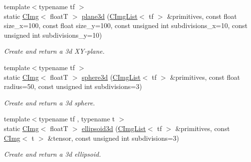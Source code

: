 \begin{DoxyCompactItemize}
{\footnotesize template$<$typename tf $>$ }\\static \hyperlink{structcimg__library_1_1CImg}{CImg}$<$ floatT $>$ \hyperlink{structcimg__library_1_1CImg_a84e453e73d27d8b27abd7a87d207c6a2}{plane3d} (\hyperlink{structcimg__library_1_1CImgList}{CImgList}$<$ tf $>$ \&primitives, const float size\_\-x=100, const float size\_\-y=100, const unsigned int subdivisions\_\-x=10, const unsigned int subdivisions\_\-y=10)
\begin{DoxyCompactList}\small\item\em Create and return a 3d XY-\/plane. \item\end{DoxyCompactList}\item 
{\footnotesize template$<$typename tf $>$ }\\static \hyperlink{structcimg__library_1_1CImg}{CImg}$<$ floatT $>$ \hyperlink{structcimg__library_1_1CImg_a612264fd3b4223e6ecf99b05a6e220cd}{sphere3d} (\hyperlink{structcimg__library_1_1CImgList}{CImgList}$<$ tf $>$ \&primitives, const float radius=50, const unsigned int subdivisions=3)
\begin{DoxyCompactList}\small\item\em Create and return a 3d sphere. \item\end{DoxyCompactList}\item 
{\footnotesize template$<$typename tf , typename t $>$ }\\static \hyperlink{structcimg__library_1_1CImg}{CImg}$<$ floatT $>$ \hyperlink{structcimg__library_1_1CImg_ae24de98deb46f84769fd72c504ceedc2}{ellipsoid3d} (\hyperlink{structcimg__library_1_1CImgList}{CImgList}$<$ tf $>$ \&primitives, const \hyperlink{structcimg__library_1_1CImg}{CImg}$<$ t $>$ \&tensor, const unsigned int subdivisions=3)
\begin{DoxyCompactList}\small\item\em Create and return a 3d ellipsoid. \item\end{DoxyCompactList}\end{DoxyCompactItemize}
